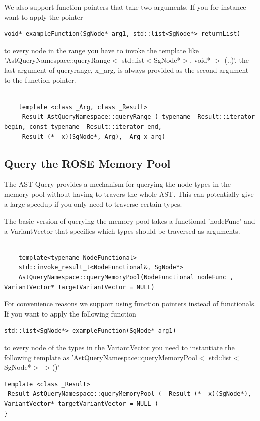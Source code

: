 We also support function pointers that take two arguments. If you for instance want to apply the pointer
\begin{verbatim}
void* exampleFunction(SgNode* arg1, std::list<SgNode*> returnList) 
\end{verbatim}
to every node in the range you have to invoke the template like 'AstQueryNamespace::queryRange$<$ std::list$<$SgNode*$>$, void* $>$ (..)'.
the last argument of queryrange, x\_arg, is always provided as the second argument to the function pointer.
\begin{verbatim}

    template <class _Arg, class _Result> 
    _Result AstQueryNamespace::queryRange ( typename _Result::iterator begin, const typename _Result::iterator end,
	_Result (*__x)(SgNode*,_Arg), _Arg x_arg)
\end{verbatim}

\subsection{Query the ROSE Memory Pool}

The AST Query provides a mechanism for querying the node types in the memory pool without having to travers
the whole AST. This can potentially give a large speedup if you only need to traverse certain types.

The basic version of querying the memory pool takes a functional 'nodeFunc' and a VariantVector that specifies
which types should be traversed as arguments.
\begin{verbatim}

    template<typename NodeFunctional>
    std::invoke_result_t<NodeFunctional&, SgNode*>
    AstQueryNamespace::queryMemoryPool(NodeFunctional nodeFunc , VariantVector* targetVariantVector = NULL)
 \end{verbatim}

For convenience reasons we support using function pointers instead of functionals. If you want to apply the
following function
\begin{verbatim}
std::list<SgNode*> exampleFunction(SgNode* arg1) 
\end{verbatim}
to every node of the types in the VariantVector you need to instantiate the following template as
'AstQueryNamespace::queryMemoryPool$<$ std::list$<$SgNode*$>$  $>$()'

\begin{verbatim}
template <class _Result> 
_Result AstQueryNamespace::queryMemoryPool ( _Result (*__x)(SgNode*), VariantVector* targetVariantVector = NULL )
}
\end{verbatim}

